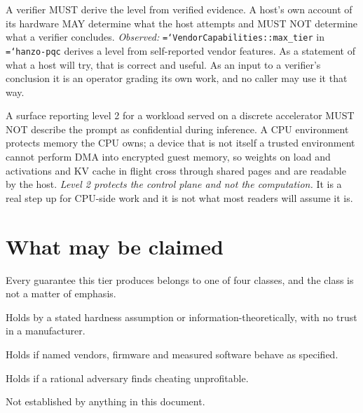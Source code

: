 \documentclass[11pt,a4paper]{article}
\newcommand{\code}[1]{\texttt{\hyphenchar\font=`\-\relax #1}}
\newcommand{\req}[1]{\textbf{#1}}
\begin{document}
\begin{description}[leftmargin=1.6em]
\item[\req{L2}] A verifier MUST derive the level from verified evidence. A host's
own account of its hardware MAY determine what the host attempts and MUST NOT
determine what a verifier concludes. \emph{Observed:} \code{VendorCapabilities::max\_tier}
in \code{hanzo-pqc} derives a level from self-reported vendor features. As a
statement of what a host will try, that is correct and useful. As an input to a
verifier's conclusion it is an operator grading its own work, and no caller may use
it that way.

\item[\req{L3}] A surface reporting level 2 for a workload served on a discrete
accelerator MUST NOT describe the prompt as confidential during inference. A CPU
environment protects memory the CPU owns; a device that is not itself a trusted
environment cannot perform DMA into encrypted guest memory, so weights on load and
activations and KV cache in flight cross through shared pages and are readable by
the host. \emph{Level 2 protects the control plane and not the computation.} It is a
real step up for CPU-side work and it is not what most readers will assume it is.
\end{description}

\section{What may be claimed}
\label{sec:claims}

Every guarantee this tier produces belongs to one of four classes, and the class is
not a matter of emphasis.

\begin{description}[leftmargin=1.4em]
\item[C --- cryptographic] Holds by a stated hardness assumption or
information-theoretically, with no trust in a manufacturer.
\item[H --- hardware trust] Holds if named vendors, firmware and measured software
behave as specified.
\item[E --- economic] Holds if a rational adversary finds cheating unprofitable.
\item[O --- open] Not established by anything in this document.
\end{description}
\end{document}
